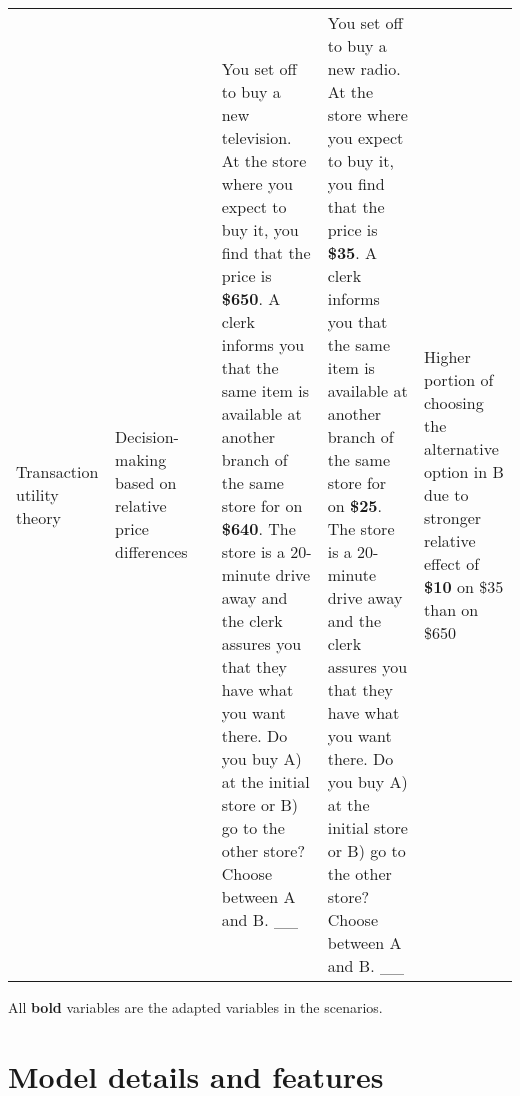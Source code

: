 \begin{small}
\begin{longtable}[c]{p{2cm}p{1.5cm}p{1.5cm}p{3.5cm}p{3.5cm}p{2cm}}
    Transaction utility theory & Decision-making based on relative price differences & \textcite{thaler1983transaction} & You set off to buy a new television. At the store where you expect to buy it, you find that the price is \textbf{\$650}. A clerk informs you that the same item is available at another branch of the same store for on \textbf{\$640}. The store is a 20-minute drive away and the clerk assures you that they have what you want there. Do you buy A) at the initial store or B) go to the other store? Choose between A and B. \_\_ & You set off to buy a new radio. At the store where you expect to buy it, you find that the price is \textbf{\$35}. A clerk informs you that the same item is available at another branch of the same store for on \textbf{\$25}. The store is a 20-minute drive away and the clerk assures you that they have what you want there. Do you buy A) at the initial store or B) go to the other store? Choose between A and B. \_\_ & Higher portion of choosing the alternative option in B due to stronger relative effect of \textbf{\$10} on \$35 than on \$650 \\
\end{longtable}
\end{small}

\par All \textbf{bold} variables are the adapted variables in the scenarios.



\newpage
\section{Model details and features}
\label{appendix:models}

